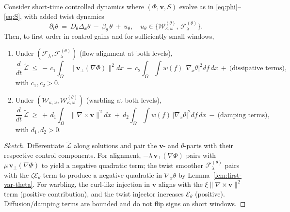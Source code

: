 \documentclass[a4paper,11pt]{article}
\begin{document}
\begin{proposition}
\label{prop:aug-monotone}
Consider short-time controlled dynamics where $(\Phi,\mathbf{v},S)$ evolve as in
\eqref{eq:phi}–\eqref{eq:S}, with added twist dynamics
\begin{equation}
\partial_t \theta \ =\ D_\theta \Delta_x \theta\ -\ \beta_\theta\,\theta\ +\ u_\theta,
\quad u_\theta \in \{\mathcal{W}^{(\theta)}_{\kappa,\omega},\, \mathcal{F}^{(\theta)}_{\lambda}\}.
\end{equation}
Then, to first order in control gains and for sufficiently small windows,
\begin{enumerate}
\item Under $(\mathcal{F}_\lambda,\mathcal{F}^{(\theta)}_{\lambda})$ (flow-alignment at both levels),
\begin{equation}
\frac{d}{dt}\,\widetilde{\mathcal{L}}\ \le\ -\,c_1 \!\int_\Omega \!\|\mathbf{v}_\perp(\nabla\Phi)\|^2 dx
\ -\ c_2 \!\int_\Omega \!\!\int w(f)\,\big|\nabla_x \theta\big|^2 df\,dx\ +\ \text{(dissipative terms)},
\end{equation}
with $c_1,c_2>0$.
\item Under $(\mathcal{W}_{\kappa,\omega},\mathcal{W}^{(\theta)}_{\kappa,\omega})$ (warbling at both levels),
\begin{equation}
\frac{d}{dt}\,\widetilde{\mathcal{L}}\ \ge\ +\,d_1 \!\int_\Omega \!\|\nabla\times \mathbf{v}\|^2 dx
\ +\ d_2 \!\int_\Omega \!\!\int w(f)\,\big|\nabla_x \theta\big|^2 df\,dx\ -\ \text{(damping terms)},
\end{equation}
with $d_1,d_2>0$.
\end{enumerate}
\end{proposition}

\begin{proof}[Sketch]
Differentiate $\widetilde{\mathcal{L}}$ along solutions and pair the
$\mathbf{v}$- and $\theta$-parts with their respective control components. For
alignment, $-\lambda\,\mathbf{v}_\perp(\nabla\Phi)$ pairs with
$\mu\,\mathbf{v}_\perp(\nabla\Phi)$ to yield a negative quadratic term; the
twist smoother $\mathcal{F}^{(\theta)}_\lambda$ pairs with the $\zeta\mathcal{E}_\theta$
term to produce a negative quadratic in $\nabla_x\theta$ by
Lemma~\ref{lem:first-var-theta}. For warbling, the curl-like injection in
$\mathbf{v}$ aligns with the $\xi\|\nabla\times \mathbf{v}\|^2$ term (positive
contribution), and the twist injector increases $\mathcal{E}_\theta$ (positive).
Diffusion/damping terms are bounded and do not flip signs on short windows.
\end{proof}
\end{document}
